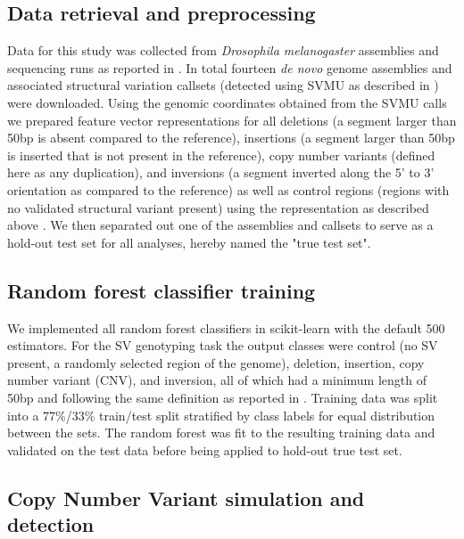 

\subsection{Data retrieval and preprocessing}

Data for this study was collected from \textit{Drosophila melanogaster} assemblies and sequencing runs as reported in \cite{chakrabortyEvolutionGenomeStructure2021,chakrabortyHiddenGeneticVariation2018,chakrabortyStructuralVariantsExhibit2019}. In total fourteen \textit{de novo} genome assemblies and associated structural variation callsets (detected using SVMU as described in \cite{chakrabortyStructuralVariantsExhibit2019}) were downloaded. Using the genomic coordinates obtained from the SVMU calls we prepared feature vector representations for all deletions (a segment larger than 50bp is absent compared to the reference), insertions (a segment larger than 50bp is inserted that is not present in the reference), copy number variants (defined here as any duplication), and inversions (a segment inverted along the 5' to 3' orientation as compared to the reference) as well as control regions (regions with no validated structural variant present) using the representation as described above \cite{chakrabortyHiddenGeneticVariation2018}. We then separated out one of the assemblies and callsets to serve as a hold-out test set for all analyses, hereby named the "true test set".

\subsection{Random forest classifier training}

We implemented all random forest classifiers in scikit-learn with the default 500 estimators. For the SV genotyping task the output classes were control (no SV present, a randomly selected region of the genome), deletion, insertion, copy number variant (CNV), and inversion, all of which had a minimum length of 50bp and following the same definition as reported in \cite{chakrabortyEvolutionGenomeStructure2021, chakrabortyHiddenGeneticVariation2018}. Training data was split into a 77\%/33\% train/test split stratified by class labels for equal distribution between the sets. The random forest was fit to the resulting training data and validated on the test data before being applied to hold-out true test set.

\subsection{Copy Number Variant simulation and detection}

